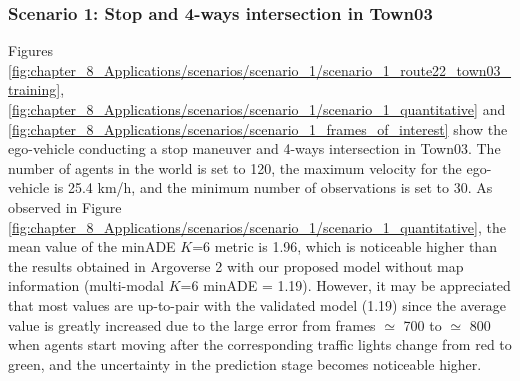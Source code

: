 \subsubsection{Scenario 1: Stop and 4-ways intersection in Town03}
\label{subsubsec:8_experimental_results_scenario_1}

Figures \ref{fig:chapter_8_Applications/scenarios/scenario_1/scenario_1_route22_town03_training}, \ref{fig:chapter_8_Applications/scenarios/scenario_1/scenario_1_quantitative} and \ref{fig:chapter_8_Applications/scenarios/scenario_1_frames_of_interest} show the ego-vehicle conducting a stop maneuver and 4-ways intersection in Town03. The number of agents in the world is set to 120, the maximum velocity for the ego-vehicle is 25.4 km/h, and the minimum number of observations is set to 30. As observed in Figure \ref{fig:chapter_8_Applications/scenarios/scenario_1/scenario_1_quantitative}, the mean value of the \ac{minADE} $K$=6 metric is 1.96, which is noticeable higher than the results obtained in Argoverse 2 with our proposed model without map information (multi-modal $K$=6 \ac{minADE} = 1.19). However, it may be appreciated that most values are up-to-pair with the validated model (1.19) since the average value is greatly increased due to the large error from frames $\simeq$ 700 to $\simeq$ 800 when agents start moving after the corresponding traffic lights change from red to green, and the uncertainty in the prediction stage becomes noticeable higher.

